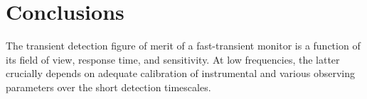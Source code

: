 \documentclass{aa}
\begin{document}




\section{Conclusions}

The  transient detection  figure  of merit  of  a fast-transient  monitor is  a
function  of  its  field  of  view,  response  time,  and  sensitivity.   At  low
frequencies,   the  latter   crucially  depends   on  adequate   calibration  of
instrumental  and   various  observing  parameters  over   the  short  detection
timescales.  
\end{document}
